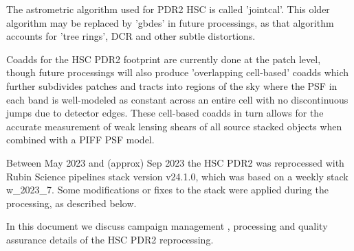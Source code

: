 The astrometric algorithm used for PDR2 HSC is called 'jointcal'.  This
older algorithm may be replaced by 'gbdes' in future processings, as that
algorithm accounts for 'tree rings', DCR and other subtle distortions.

Coadds for the HSC PDR2 footprint are currently done at the patch 
level, though future processings will also produce 'overlapping cell-based' 
coadds which further subdivides patches and tracts 
into regions of the sky where the PSF in each band is well-modeled as constant 
across an entire cell with no discontinuous jumps due to detector edges.
These cell-based coadds in turn allows for the accurate measurement of 
weak lensing shears of all source stacked objects when combined with
a PIFF PSF model.

Between May 2023 and (approx) Sep 2023 the HSC PDR2 was reprocessed with 
Rubin Science pipelines stack version v24.1.0, which was 
based on a weekly stack w\_2023\_7.  Some modifications or fixes to the stack
were applied during the processing, as described below.

In this document we discuss campaign management ,
processing  and quality 
assurance  details of the HSC PDR2 reprocessing.


